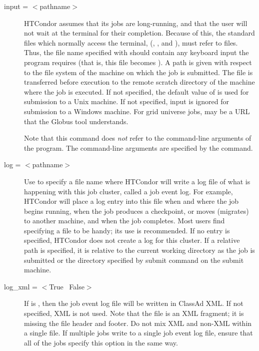 \begin{description}
\label{man-condor-submit-input}
\item[input = $<$pathname$>$]
HTCondor assumes that its jobs are
long-running, and that the user will not wait at the terminal for their
completion. Because of this, the standard files which normally access
the terminal, (, , and ),
must refer to files. Thus,
the file name specified with  should contain any keyboard
input the program requires (that is, this file becomes ).
A path is given with respect to the file system of the machine
on which the job is submitted.
The file is transferred before execution
to the remote scratch directory of the machine where the job is executed. 
If not specified, the default value
of  is used for submission to a Unix machine.
If not specified, input is ignored
for submission to a Windows machine.
For grid universe jobs,  may be a URL that the Globus
tool  understands.

Note that this command does \emph{not} refer to the command-line
arguments of the program.  The command-line arguments are specified by
the  command.


\label{man-condor-submit-log}
\item[log = $<$pathname$>$] 
Use  to specify a file name where
HTCondor will write a log file of what is happening with this job cluster,
called a job event log.
For example, HTCondor will place a log entry into this file
when and where the job begins running,
when the job produces a checkpoint, or moves (migrates) to another machine,
and when the job completes.
Most users find specifying a  file to be handy;
its use is recommended. If no  entry is specified, 
HTCondor does not create a log for this cluster.
If a relative path is specified, it is relative to the 
current working directory as the job is submitted or
the directory specified by submit command 
on the submit machine.


\label{man-condor-submit-log-xml}
\item[log\_xml = $<$True \Bar\ False$>$]
If  is , 
then the job event log file will be written in ClassAd XML.
If not specified, XML is not used.
Note that the file is an XML fragment; it is
missing the file header and footer.
Do not mix XML and non-XML within a single file.
If multiple jobs write to a
single job event log file, ensure that all of the jobs specify
this option in the same way.


\end{description}

